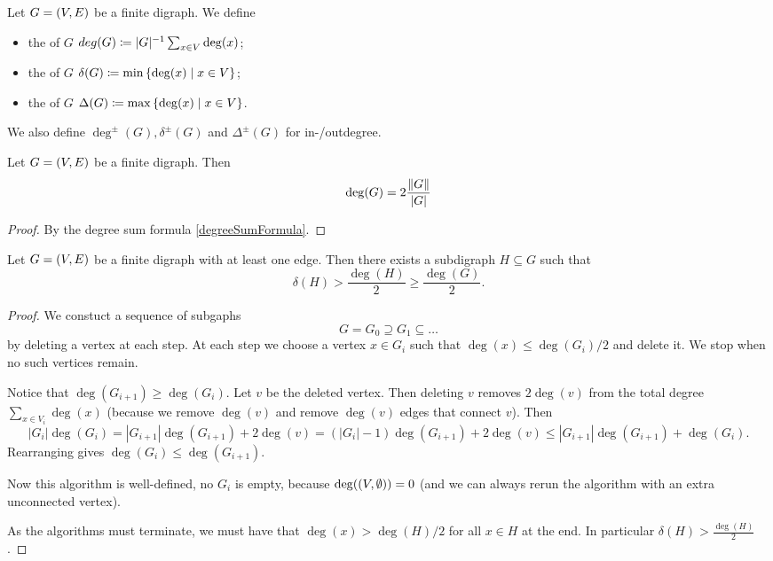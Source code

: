 \begin{definition}
Let $G = \left( V,E \right)$ be a finite digraph. We define
\begin{itemize}
\item the  of $G$ $deg(G) \coloneqq |G|^{-1}\sum_{x\in V}\deg(x)$;
\item the  of $G$ $\delta(G) \defeq \min\setbuilder{\deg(x)}{x\in V}$;
\item the  of $G$ $\Delta(G) \defeq \max\setbuilder{\deg(x)}{x\in V}$.
\end{itemize}
We also define $\deg^\pm(G), \delta^\pm(G)$ and $\Delta^\pm(G)$ for in-/outdegree.
\end{definition}

\begin{lemma}
Let $G = \left( V,E \right)$ be a finite digraph. Then
\[ \deg(G) = 2\frac{\lVert G\rVert}{|G|} \]
\end{lemma}
\begin{proof}
By the degree sum formula \ref{degreeSumFormula}.
\end{proof}

\begin{proposition}
Let $G = \left( V,E \right)$ be a finite digraph with at least one edge. Then there exists a subdigraph $H \subseteq G$ such that
\[ \delta(H) > \frac{\deg(H)}{2} \geq \frac{\deg(G)}{2}. \]
\end{proposition}
\begin{proof}
We constuct a sequence of subgaphs
\[ G = G_0 \supseteq G_1 \subseteq \ldots \]
by deleting a vertex at each step. At each step we choose a vertex $x\in G_i$ such that $\deg(x) \leq \deg(G_i)/2$ and delete it. We stop when no such vertices remain.

Notice that $\deg(G_{i+1}) \geq \deg(G_i)$. Let $v$ be the deleted vertex. Then deleting $v$ removes $2\deg(v)$ from the total degree $\sum_{x\in V_i}\deg(x)$ (because we remove $\deg(v)$ and remove $\deg(v)$ edges that connect $v$). Then
\[ |G_i|\deg(G_{i}) = |G_{i+1}|\deg(G_{i+1}) + 2\deg(v) = (|G_{i}|-1)\deg(G_{i+1}) + 2\deg(v) \leq |G_{i+1}|\deg(G_{i+1}) + \deg(G_i). \]
Rearranging gives $\deg(G_i) \leq \deg(G_{i+1})$.

Now this algorithm is well-defined, no $G_i$ is empty, because $\deg(\left( V, \emptyset \right)) = 0$ (and we can always rerun the algorithm with an extra unconnected vertex).

As the algorithms must terminate, we must have that $\deg(x) > \deg(H)/2$ for all $x\in H$ at the end. In particular $\delta(H) > \frac{\deg(H)}{2}$.
\end{proof}

